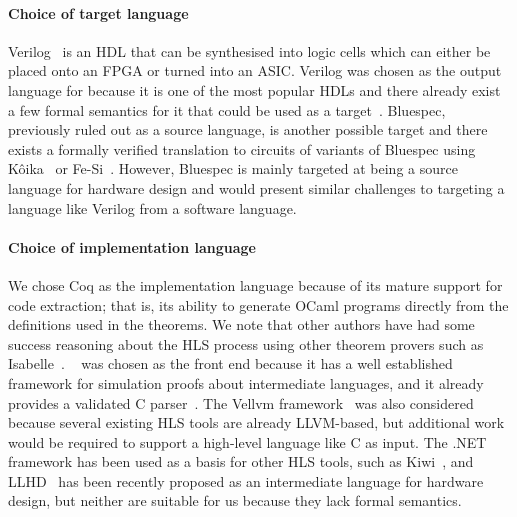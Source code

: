 \paragraph{Choice of target language}

Verilog~\cite{06_ieee_stand_veril_hardw_descr_languag} is an \gls{HDL} that can
be synthesised into logic cells which can either be placed onto an \gls{FPGA} or
turned into an \gls{ASIC}.  Verilog was chosen as the output language for
\vericert{} because it is one of the most popular HDLs and there already exist a
few formal semantics for it that could be used as a
target~\cite{lööw19_verif_compil_verif_proces, meredith10_veril}.  Bluespec,
previously ruled out as a source language, is another possible target and there
exists a formally verified translation to circuits of variants of Bluespec using
K\^{o}ika~\cite{bourgeat20_essen_blues} or
Fe-Si~\cite{braibant13_formal_verif_hardw_synth}.  However, Bluespec is mainly
targeted at being a source language for hardware design and would present
similar challenges to targeting a language like Verilog from a software
language.



\paragraph{Choice of implementation language}

We chose Coq as the implementation language because of its mature support for
code extraction; that is, its ability to generate OCaml programs directly from
the definitions used in the theorems.  We note that other authors have had some
success reasoning about the HLS process using other theorem provers such as
Isabelle~\cite{ellis08_csicgfu}.
\compcert{}~\cite{leroy09_formal_verif_realis_compil} was chosen as the front
end because it has a well established framework for simulation proofs about
intermediate languages, and it already provides a validated C
parser~\cite{jourdan12_valid_lr_parser}.  The Vellvm
framework~\cite{zhao12_formal_llvm_inter_repres_verif_progr_trans} was also
considered because several existing HLS tools are already LLVM-based, but
additional work would be required to support a high-level language like C as
input.  The .NET framework has been used as a basis for other HLS tools, such as
Kiwi~\cite{greaves08_kiwi}, and LLHD~\cite{schuiki20_llhd} has been recently
proposed as an intermediate language for hardware design, but neither are
suitable for us because they lack formal semantics.


